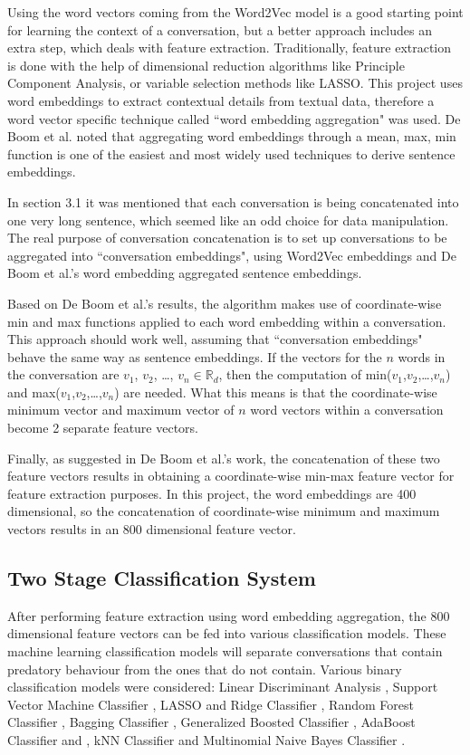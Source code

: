 \documentclass[11pt]{article}
\newcommand{\R}{\mathbb{R}}
\begin{document}
Using the word vectors coming from the Word2Vec model is a good starting point for learning the context of a conversation, but a better approach includes an extra step, which deals with feature extraction. Traditionally, feature extraction is done with the help of dimensional reduction algorithms like Principle Component Analysis, or variable selection methods like LASSO. This project uses word embeddings to extract contextual details from textual data, therefore a word vector specific technique called ``word embedding aggregation" \cite{de2016representation} was used. De Boom et al. noted that aggregating word embeddings through a mean, max, min function is one of the easiest and most widely used techniques to derive sentence embeddings. 

In section 3.1 it was mentioned that each conversation is being concatenated into one very long sentence, which seemed like an odd choice for data manipulation. The real purpose of conversation concatenation is to set up conversations to be aggregated into ``conversation embeddings", using Word2Vec embeddings and De Boom et al.'s word embedding aggregated sentence embeddings. 

Based on De Boom et al.'s results, the algorithm makes use of coordinate-wise min and max functions applied to each word embedding within a conversation. This approach should work well, assuming that ``conversation embeddings" behave the same way as sentence embeddings. If the vectors for the $n$ words in the conversation are $v_1$, $v_2$, \dots, $v_n \in \R_{d}$, then the computation of min($v_1$,$v_2$,\dots,$v_n$) and max($v_1$,$v_2$,\dots,$v_n$) are needed. What this means is that the coordinate-wise minimum vector and maximum vector of $n$ word vectors within a conversation become 2 separate feature vectors. 

Finally, as suggested in De Boom et al.'s work, the concatenation of these two feature vectors results in obtaining a coordinate-wise min-max feature vector for feature extraction purposes. In this project, the word embeddings are 400 dimensional, so the concatenation of coordinate-wise minimum and maximum vectors results in an 800 dimensional feature vector.

\subsection{Two Stage Classification System}
After performing feature extraction using word embedding aggregation, the 800 dimensional feature vectors can be fed into various classification models. These machine learning classification models will separate conversations that contain predatory behaviour from the ones that do not contain. Various binary classification models were considered: Linear Discriminant Analysis \cite{ripley2007pattern}, Support Vector Machine Classifier \cite{fan2008liblinear}, LASSO and Ridge Classifier \cite{friedman2010regularization}, Random Forest Classifier \cite{breiman2001random}, Bagging Classifier \cite{breiman1996bagging}, Generalized Boosted Classifier \cite{ridgeway2006gbm}, AdaBoost Classifier \cite{freund1996experiments} and \cite{hastie2009multi}, kNN Classifier \cite{ripley2007pattern} and Multinomial Naive Bayes Classifier \cite{mccallum1998comparison}. 
\end{document}
